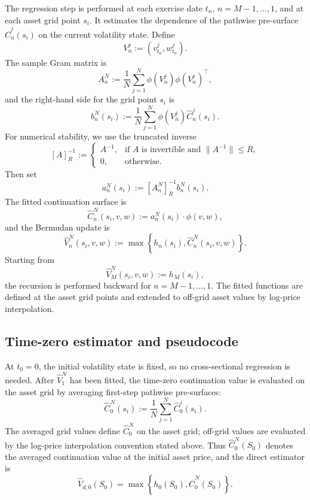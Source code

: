 \documentclass[pdflatex,sn-mathphys-num]{sn-jnl}
\theoremstyle{thmstyleone}%
\theoremstyle{thmstylethree}%
\theoremstyle{thmstyletwo}%
\begin{document}
The regression step is performed at each exercise date $t_n$,
$n=M-1,\ldots,1$, and at each asset grid point $s_i$. It estimates the
dependence of the pathwise pre-surface $\widehat C_n^j(s_i)$ on the current
volatility state. Define
$$
V_n^j:=(v_{t_n}^j,w_{t_n}^j).
$$
The sample Gram matrix is
$$
A_n^N
:=
\frac1N\sum_{j=1}^N
\phi(V_n^j)\phi(V_n^j)^\top,
$$
and the right-hand side for the grid point $s_i$ is
$$
b_n^N(s_i)
:=
\frac1N\sum_{j=1}^N
\phi(V_n^j)\widehat C_n^j(s_i).
$$
For numerical stability, we use the truncated inverse
\begin{equation}\label{eq:estimated_coeff}
[A]^{-1}_R
:=
\begin{cases}
A^{-1}, & \text{if $A$ is invertible and }\|A^{-1}\|\le R,\\
0,  & \text{otherwise.}
\end{cases}
\end{equation}
Then set
\begin{equation}
a_n^N(s_i):=[A_n^N]^{-1}_R b_n^N(s_i).
\label{eq:lsq}
\end{equation}
The fitted continuation surface is
$$
\widehat C_n^N(s_i,v,w)
:=
a_n^N(s_i)\cdot\phi(v,w),
$$
and the Bermudan update is
$$
\widehat V_n^N(s_i,v,w)
:=
\max\left\{
h_n(s_i),
\widehat C_n^N(s_i,v,w)
\right\}.
$$
Starting from
$$
\widehat V_M^N(s_i,v,w):=h_M(s_i),
$$
the recursion is performed backward for $n=M-1,\ldots,1$. The fitted functions
are defined at the asset grid points and extended to off-grid asset values by
log-price interpolation.

\subsection{Time-zero estimator and pseudocode}
At $t_0=0$, the initial volatility state is fixed, so no cross-sectional
regression is needed. After $\widehat V_1^N$ has been fitted, the time-zero
continuation value is evaluated on the asset grid by averaging first-step
pathwise pre-surfaces:
$$
\widehat C_0^N(s_i)
:=
\frac1N
\sum_{j=1}^{N}
\widehat C_0^j(s_i).
$$
The averaged grid values define $\widehat C_0^N$ on the asset grid; off-grid
values are evaluated by the log-price interpolation convention stated above.
Thus $\widehat C_0^N(S_0)$ denotes the averaged continuation value at the
initial asset price, and the direct estimator is
$$
\widehat V_{d,0}(S_0)
=
\max\left\{
h_0(S_0),
\widehat C_0^N(S_0)
\right\}.
$$
\end{document}
